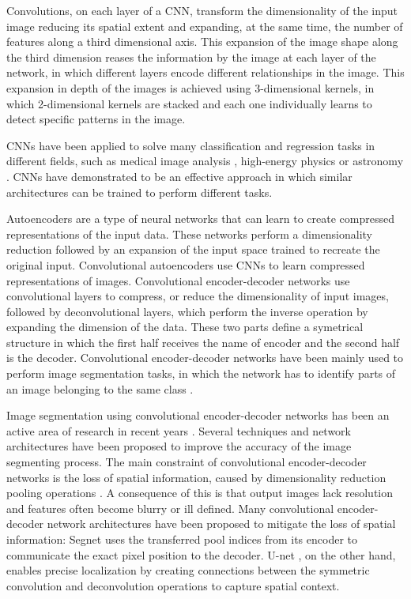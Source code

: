 \documentclass[twocol]{ametsoc}
\begin{document}
Convolutions, on each layer of a CNN, transform the dimensionality of the input image reducing its spatial extent and expanding, at the same time, the number of features along a third dimensional axis. This expansion of the image shape along the third dimension reases the information by the image at each layer of the network, in which different layers encode different relationships in the image. This expansion in depth of the images is achieved using 3-dimensional kernels, in which 2-dimensional kernels are stacked and each one individually learns to detect specific patterns in the image.

CNNs have been applied to solve many classification and regression tasks in different fields, such as medical image analysis \citep{litjens2017survey}, high-energy physics \citep{baldi2014searching} or astronomy \citep{dieleman2015rotation}. CNNs have demonstrated to be an effective approach in which similar architectures can be trained to perform different tasks.

Autoencoders \citep{hinton2006reducing} are a type of neural networks that can learn to create compressed representations of the input data. These networks perform a dimensionality reduction followed by an expansion of the input space trained to recreate the original input. Convolutional autoencoders \citep{masci2011stacked} use CNNs to learn compressed representations of images. Convolutional encoder-decoder networks use convolutional layers to compress, or reduce the dimensionality of input images, followed by deconvolutional layers, which perform the inverse operation by expanding the dimension of the data. These two parts define a symetrical structure in which the first half receives the name of encoder and the second half is the decoder. Convolutional encoder-decoder networks have been mainly used to perform image segmentation tasks, in which the network has to identify parts of an image belonging to the same class \citep{long2015fully}.

Image segmentation using convolutional encoder-decoder networks has been an active area of research in recent years \citep{krizhevsky2012imagenet,chen2018deeplab}. Several techniques and network architectures have been proposed to improve the accuracy of the image segmenting process. The main constraint of convolutional encoder-decoder networks is the loss of spatial information, caused by dimensionality reduction pooling operations \citep{scherer2010evaluation}. A consequence of this is that output images lack resolution and features often become blurry or ill defined. Many convolutional encoder-decoder network architectures have been proposed to mitigate the loss of spatial information: Segnet \citep{badrinarayanan2017segnet} uses the transferred pool indices from its encoder to communicate the exact pixel position to the decoder. U-net \citep{ronneberger2015u}, on the other hand, enables precise localization by creating connections between the symmetric convolution and deconvolution operations to capture spatial context.
\end{document}
